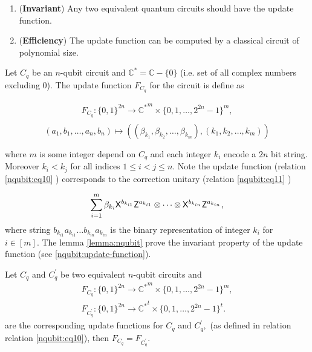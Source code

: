 \begin{enumerate}
\item ({\bf Invariant}) Any two equivalent quantum circuits should have the update function.
\item ({\bf Efficiency}) The update function can be computed by a classical circuit of polynomial size.
\end{enumerate}

Let $C_q$ be an $n$-qubit circuit and $\mathbb{C}^*= \mathbb{C}-\{0\}$ (i.e. set of all complex numbers excluding 0). The update function $F_{C_q}$ for the circuit is define as

\begin{equation}
\label{nqubit:eq10}
\begin{aligned}
F_{C_q}: \{0,1\}^{2n}\longrightarrow {\mathbb{C}^*}^m\times \{0,1,\ldots,2^{2n}-1\}^m, \\
\end{aligned}
\end{equation}
$$(a_1,b_1,\ldots, a_n,b_n) \mapsto ((\beta_{k_1}, \beta_{k_2},\ldots, \beta_{k_m}),(k_1,k_2,\ldots, k_m))$$

where $m$ is some integer depend on $C_q$ and each integer $k_i$ encode a $2n$ bit string. Moreover  $k_i< k_j$ for all indices $1 \leq i<j \leq n.$ Note  the update function (relation \ref{nqubit:eq10} ) corresponds to the correction unitary (relation  \ref{nqubit:eq11} )

\begin{equation}
\label{nqubit:eq11}
\begin{aligned}
\sum_{i=1}^m \beta_{k_i} {\sf X}^{b_{k_{i1}}} {\sf Z}^{a_{k_{i1}}} \otimes \cdots  \otimes {\sf X}^{b_{k_{in}}} {\sf Z}^{a_{k_{in}}},
\end{aligned}
\end{equation}
where string $b_{k_{i1}} a_{k_{i1}}\ldots b_{k_{in}} a_{k_{in}}$ is the binary representation of integer $k_i$ for $i\in[m].$ The lemma \ref{lemma:nqubit} prove the invariant property of the update function (see \ref{nqubit:update-function}).


\begin{lemma}
\label{lemma:nqubit}
Let $C_q$ and $C_q^\prime$ be two equivalent $n$-qubit circuits and
\begin{equation*}
\begin{aligned}
F_{C_q}: \{0,1\}^{2n}\longrightarrow {\mathbb{C}^*}^m\times \{0,1,\ldots,2^{2n}-1\}^m,  \\
F_{C_q^\prime}: \{0,1\}^{2n}\longrightarrow {\mathbb{C}^*}^{t}\times \{0,1,\ldots,2^{2n}-1\}^{t}.
\end{aligned}
\end{equation*}
are the corresponding update functions for $C_q$ and $C_q^\prime,$  (as defined in relation relation \ref{nqubit:eq10}), then $F_{C_q}=F_{C_q^\prime}.$
\end{lemma}

